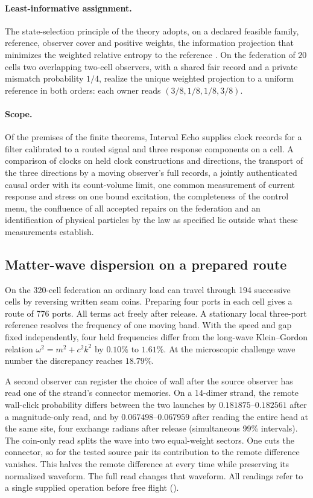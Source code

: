 \documentclass[11pt]{article}
\theoremstyle{definition}
\theoremstyle{remark}
\theoremstyle{plain}
\begin{document}
\paragraph{Least-informative assignment.}
The state-selection principle of the theory adopts, on a declared feasible
family, reference, observer cover and positive weights, the information
projection that minimizes the weighted relative entropy to the reference
\cite{flagship}. On the federation of $20$ cells two overlapping two-cell
observers, with a shared fair record and a private mismatch probability
$1/4$, realize the unique weighted projection to a uniform reference in
both orders: each owner reads $(3/8,1/8,1/8,3/8)$.

\paragraph{Scope.}
Of the premises of the finite theorems, Interval Echo supplies clock records for a filter calibrated to a routed signal and three response components on a cell. A comparison of clocks on held
clock constructions and directions, the transport of the three directions
by a moving observer's full records, a jointly authenticated causal order
with its count-volume limit, one common measurement of current response
and stress on one bound excitation, the completeness of the control menu,
the confluence of all accepted repairs on the federation and an
identification of physical particles by the law as specified lie outside
what these measurements establish.

\subsection{Matter-wave dispersion on a prepared route}
\label{sec:written-route}

On the 320-cell federation an ordinary load can travel through 194
successive cells by reversing written seam coins. Preparing four ports
in each cell gives a route of 776 ports. All terms act freely after
release. A stationary local three-port reference resolves the frequency
of one moving band. With the speed and gap fixed independently, four
held frequencies differ from the long-wave Klein--Gordon relation
$\omega^2=m^2+c^2k^2$ by $0.10\%$ to $1.61\%$. At the microscopic
challenge wave number the discrepancy reaches $18.79\%$.

A second observer can register the choice of wall after the source
observer has read one of the strand's connector memories. On a
14-dimer strand, the remote wall-click probability differs between the
two launches by $0.181875$--$0.182561$ after a magnitude-only read,
and by $0.067498$--$0.067959$ after reading the entire head at the
same site, four exchange radians after release (simultaneous 99\%
intervals). The coin-only read splits the wave into two equal-weight
sectors. One cuts the connector, so for the tested source pair its
contribution to the remote difference vanishes. This halves the
remote difference at every time while preserving its normalized
waveform. The full read changes that waveform. All readings refer
to a single supplied operation before free flight
().
\end{document}
